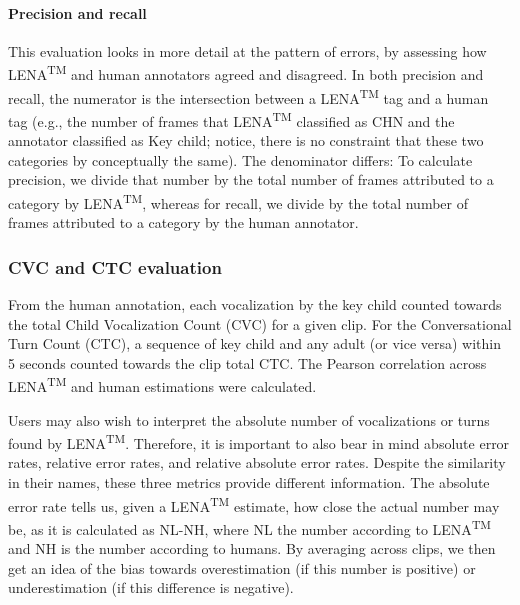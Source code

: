 \documentclass[english,floatsintext,man]{apa6}
\begin{document}
\paragraph{Precision and recall}\label{precision-and-recall}

This evaluation looks in more detail at the pattern of errors, by
assessing how LENA\textsuperscript{TM} and human annotators agreed and
disagreed. In both precision and recall, the numerator is the
intersection between a LENA\textsuperscript{TM} tag and a human tag
(e.g., the number of frames that LENA\textsuperscript{TM} classified as
CHN and the annotator classified as Key child; notice, there is no
constraint that these two categories by conceptually the same). The
denominator differs: To calculate precision, we divide that number by
the total number of frames attributed to a category by
LENA\textsuperscript{TM}, whereas for recall, we divide by the total
number of frames attributed to a category by the human annotator.

\subsubsection{CVC and CTC evaluation}\label{cvc-and-ctc-evaluation}

From the human annotation, each vocalization by the key child counted
towards the total Child Vocalization Count (CVC) for a given clip. For
the Conversational Turn Count (CTC), a sequence of key child and any
adult (or vice versa) within 5 seconds counted towards the clip total
CTC. The Pearson correlation across LENA\textsuperscript{TM} and human
estimations were calculated.

Users may also wish to interpret the absolute number of vocalizations or
turns found by LENA\textsuperscript{TM}. Therefore, it is important to
also bear in mind absolute error rates, relative error rates, and
relative absolute error rates. Despite the similarity in their names,
these three metrics provide different information. The absolute error
rate tells us, given a LENA\textsuperscript{TM} estimate, how close the
actual number may be, as it is calculated as NL-NH, where NL the number
according to LENA\textsuperscript{TM} and NH is the number according to
humans. By averaging across clips, we then get an idea of the bias
towards overestimation (if this number is positive) or underestimation
(if this difference is negative).
\end{document}
